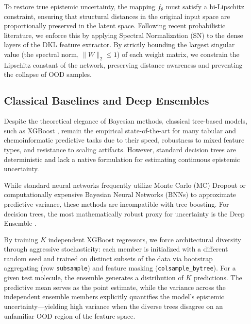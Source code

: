 To restore true epistemic uncertainty, the mapping $f_\theta$ must satisfy a bi-Lipschitz constraint, ensuring that structural distances in the original input space are proportionally preserved in the latent space. Following recent probabilistic literature, we enforce this by applying Spectral Normalization (SN) to the dense layers of the DKL feature extractor. By strictly bounding the largest singular value (the spectral norm, $\|W\|_2 \le 1$) of each weight matrix, we constrain the Lipschitz constant of the network, preserving distance awareness and preventing the collapse of OOD samples.

\subsection{Classical Baselines and Deep Ensembles}
Despite the theoretical elegance of Bayesian methods, classical tree-based models, such as XGBoost \cite{chen2016xgboost}, remain the empirical state-of-the-art for many tabular and chemoinformatic predictive tasks due to their speed, robustness to mixed feature types, and resistance to scaling artifacts. However, standard decision trees are deterministic and lack a native formulation for estimating continuous epistemic uncertainty.

While standard neural networks frequently utilize Monte Carlo (MC) Dropout or computationally expensive Bayesian Neural Networks (BNNs) to approximate predictive variance, these methods are incompatible with tree boosting. For decision trees, the most mathematically robust proxy for uncertainty is the Deep Ensemble \cite{lakshminarayanan2017simple}. 

By training $K$ independent XGBoost regressors, we force architectural diversity through aggressive stochasticity: each member is initialized with a different random seed and trained on distinct subsets of the data via bootstrap aggregating (row \texttt{subsample}) and feature masking (\texttt{colsample\_bytree}). For a given test molecule, the ensemble generates a distribution of $K$ predictions. The predictive mean serves as the point estimate, while the variance across the independent ensemble members explicitly quantifies the model's epistemic uncertainty—yielding high variance when the diverse trees disagree on an unfamiliar OOD region of the feature space.